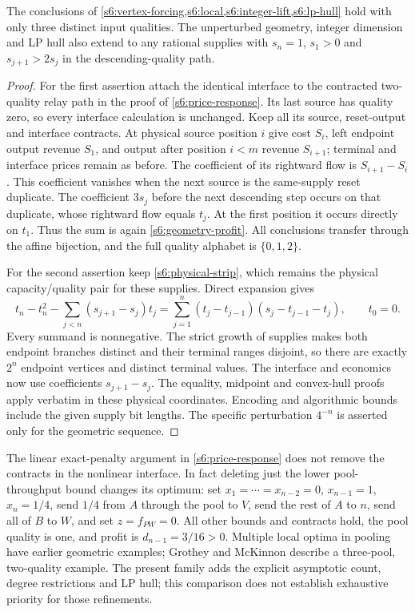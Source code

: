 \begin{corollary}\label{s6:alphabet-geometry}
The conclusions of \cref{s6:vertex-forcing,s6:local,s6:integer-lift,s6:lp-hull}
hold with only three distinct input qualities. The unperturbed geometry,
integer dimension and LP hull also extend to any rational supplies with
$s_n=1$, $s_1>0$ and $s_{j+1}>2s_j$ in the descending-quality path.
\end{corollary}
\begin{proof}
For the first assertion attach the identical interface to the contracted
two-quality relay path in the proof of \cref{s6:price-response}. Its
last source has quality zero, so every interface calculation is unchanged.
Keep all its source, reset-output and interface contracts. At physical
source position $i$ give cost $S_i$, left endpoint output revenue $S_1$,
and output after position $i<m$ revenue $S_{i+1}$; terminal and interface
prices remain as before. The coefficient of its rightward flow is
$S_{i+1}-S_i$. This coefficient vanishes when the next source is the
same-supply reset duplicate. The coefficient $3s_j$ before the next
descending step occurs on that duplicate, whose rightward flow equals
$t_j$. At the first position it occurs directly on $t_1$. Thus the
sum is again \eqref{s6:geometry-profit}. All conclusions transfer through
the affine bijection, and the full quality alphabet is $\{0,1,2\}$.

For the second assertion keep \eqref{s6:physical-strip}, which remains
the physical capacity/quality pair for these supplies. Direct expansion gives
\[
 t_n-t_n^2-\sum_{j<n}(s_{j+1}-s_j)t_j
 =\sum_{j=1}^n(t_j-t_{j-1})(s_j-t_{j-1}-t_j),\qquad t_0=0.
\]
Every summand is nonnegative. The strict growth of supplies makes both
endpoint branches distinct and their terminal ranges disjoint, so there
are exactly $2^n$ endpoint vertices and distinct terminal values.
The interface and economics now use coefficients $s_{j+1}-s_j$.
The equality, midpoint and convex-hull proofs apply verbatim in these
physical coordinates. Encoding and algorithmic bounds include the given
supply bit lengths. The specific perturbation $4^{-n}$ is asserted only
for the geometric sequence.
\end{proof}

The linear exact-penalty argument in \cref{s6:price-response} does not
remove the contracts in the nonlinear interface. In fact deleting just
the lower pool-throughput bound changes its optimum: set
$x_1=\cdots=x_{n-2}=0$, $x_{n-1}=1$, $x_n=1/4$, send $1/4$ from
$A$ through the pool to $V$, send the rest of $A$ to $n$, send all of
$B$ to $W$, and set $z=f_{PW}=0$. All other bounds and contracts hold,
the pool quality is one, and profit is $d_{n-1}=3/16>0$.
Multiple local optima in pooling have earlier geometric examples;
Grothey and McKinnon \cite[Section~3]{s6:grothey2020} describe a
three-pool, two-quality example. The present family adds the explicit
asymptotic count, degree restrictions and LP hull; this comparison does
not establish exhaustive priority for those refinements.


